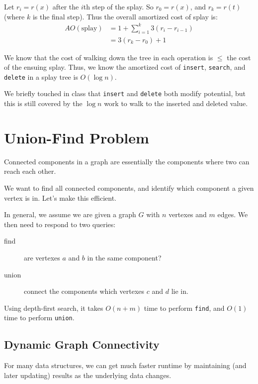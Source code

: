                 Let $r_i = r(x)$ after the $i$th step of the splay.
                So $r_0 = r(x)$, and $r_k = r(t)$ (where $k$ is the final step).
                Thus the overall amortized cost of splay is:
                \begin{align*}
                    A O(\text{splay}) &= 1 + \sum_{i=1}^{k} 3(r_i - r_{i-1}) \\
                    &= 3(r_k - r_0) + 1
                \end{align*}

                We know that the cost of walking down the tree in each operation is $\le$ the cost of the ensuing splay.
                Thus, we know the amortized cost of \verb|insert|, \verb|search|, and \verb|delete| in a splay tree is $O(\log n)$.

                We briefly touched in class that \verb|insert| and \verb|delete| both modify potential, but this is still covered by the $\log n$ work to walk to the inserted and deleted value.
        \chapter{Union-Find Problem} %
        \label{cha:union_find_problem}
            Connected components in a graph are essentially the components where two can reach each other.

            We want to find all connected components, and identify which component a given vertex is in.
            Let's make this efficient.

            In general, we assume we are given a graph $G$ with $n$ vertexes and $m$ edges.
            We then need to respond to two queries:
            \begin{description}
                \item[find] are vertexes $a$ and $b$ in the same component?
                \item[union] connect the components which vertexes $c$ and $d$ lie in.
            \end{description}

            Using depth-first search, it takes $O(n+m)$ time to perform \verb|find|, and $O(1)$ time to perform \verb|union|.

            \section{Dynamic Graph Connectivity} %
            \label{sec:dynamic_graph_connectivity}
                For many data structures, we can get much faster runtime by maintaining (and later updating) results as the underlying data changes.

